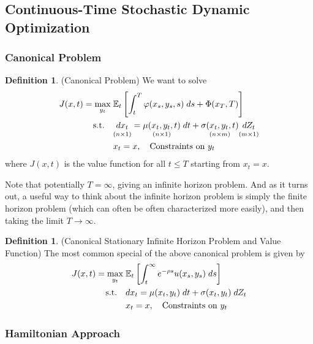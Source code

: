 \documentclass[12pt]{book}
\numberwithin{equation}{section} %
\theoremstyle{plain}
\theoremstyle{definition}
\newtheorem{defn}[thm]{Definition}
\theoremstyle{remark}
\newcommand{\ra}{\rightarrow}
\newcommand{\E}{\mathbb{E}}
\begin{document}
\clearpage
\subsection{Continuous-Time Stochastic Dynamic Optimization}

\subsubsection{Canonical Problem}

\begin{defn}(Canonical Problem)
We want to solve
\begin{align}
  J(x,t)
  =
  \max_{y_t}
  \;&
  \E_t\left[
    \int_t^T
    \varphi(x_s,y_s,s)\;ds
    +
    \Phi(x_T,T)
  \right]
  \notag
  \\
  \qquad\text{s.t.}\quad
  &
  \underset{(n\times 1)}{%
    \vphantom{\mu(x_t,y_t,t)}
    dx_t
  }
  =
  \underset{(n\times 1)}{%
    \mu(x_t,y_t,t)
  }
  \;dt
  +
  \underset{(n\times m)}{%
    \vphantom{\mu(x_t,y_t,t)}
    \sigma(x_t,y_t,t)
  }
  \underset{(m\times 1)}{%
    \vphantom{\mu(x_t,y_t,t)}
    dZ_t
  }
  \notag
  \\
  & x_t = x,\quad
  \text{Constraints on $y_t$}
  \notag
\end{align}
where $J(x,t)$ is the value function for all $t\leq T$ starting from
$x_t=x$.

Note that potentially $T=\infty$, giving an infinite horizon problem.
And as it turns out, a useful way to think about the infinite horizon
problem is simply the finite horizon problem (which can often be
often characterized more easily), and then taking the limit
$T\ra\infty$.
\end{defn}

\begin{defn}
(Canonical Stationary Infinite Horizon Problem and Value Function)
The most common special of the above canonical problem is given by
\begin{align}
  J(x,t)
  =
  \max_{y_t}
  \;&
  \E_t\left[
    \int_t^\infty
    e^{-\rho s}
    u(x_s,y_s)
    \;ds
  \right]
  \notag
  \\
  \qquad\text{s.t.}\quad
  &
  dx_t
  =
  \mu(x_t,y_t)\;dt
  +
  \sigma(x_t,y_t)\;dZ_t
  \notag
  \\
  & x_t=x,
  \quad\text{Constraints on $y_t$}
  \notag
\end{align}
\end{defn}


\subsubsection{Hamiltonian Approach}
\end{document}
